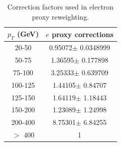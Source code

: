 \begin{table}[htdp]
	\centering
  \begin{tabular}{|c|c|}
  \hline
  $p_T$ (GeV)  & $e$ proxy corrections \\ \hline
  20-50  & 0.95072$\pm$ 0.0348999  \\ \hline
  50-75  & 1.36595$\pm$ 0.177898  \\ \hline
  75-100  & 3.25333$\pm$ 0.639709  \\ \hline
  100-125  & 1.44105$\pm$ 0.84707  \\ \hline
  125-150  & 1.64119$\pm$ 1.18443  \\ \hline
  150-200  & 1.23089$\pm$ 1.24998  \\ \hline
  200-400  & 8.75301$\pm$ 6.84255  \\ \hline
  $>$ 400 & 1 \\ \hline
  \end{tabular}
  \caption{Correction factors used in electron proxy reweighting.}
  \label{table:correctionsfakelep}
\end{table}
